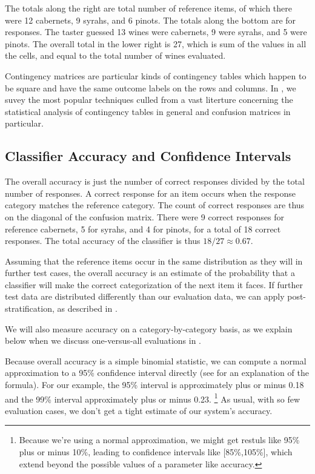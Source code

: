The totals along the right are total number of reference items, of
which there were 12 cabernets, 9 syrahs, and 6 pinots.  The totals
along the bottom are for responses.  The taster guessed 13 wines were
cabernets, 9 were syrahs, and 5 were pinots.  The overall total in the
lower right is 27, which is sum of the values in all the cells, and
equal to the total number of wines evaluated.

Contingency matrices are particular kinds of contingency tables which
happen to be square and have the same outcome labels on the rows and
columns.  In , we
suvey the most popular techniques culled from a vast literture
concerning the statistical analysis of contingency tables in general
and confusion matrices in particular.  

\subsection{Classifier Accuracy and Confidence Intervals}

The overall accuracy is just the number of correct responses divided
by the total number of responses.  A correct response for an item
occurs when the response category matches the reference category.  The
count of correct responses are thus on the diagonal of the confusion
matrix.  There were 9 correct responses for reference cabernets, 5 for
syrahs, and 4 for pinots, for a total of 18 correct responses.  The
total accuracy of the classifier is thus $18/27 \approx 0.67$.  

Assuming that the reference items occur in the same distribution as
they will in further test cases, the overall accuracy is an estimate
of the probability that a classifier will make the correct
categorization of the next item it faces.  If further test data are
distributed differently than our evaluation data, we can apply
post-stratification, as described in
.

We will also measure accuracy on a category-by-category basis, as we
explain below when we discuss one-versus-all evaluations in
.

Because overall accuracy is a simple binomial statistic, we can
compute a normal approximation to a 95\% confidence interval directly
(see  for an explanation of the
formula).  For our example, the 95\% interval is approximately plus or
minus 0.18 and the 99\% interval approximately plus or minus 0.23.%
%
\footnote{Because we're using a normal approximation, we might get
  restuls like 95\% plus or minus 10\%, leading to confidence
  intervals like [85\%,105\%], which extend beyond the possible values
  of a parameter like accuracy.}
%
As usual, with so few evaluation cases, we don't get a tight estimate
of our system's accuracy.

